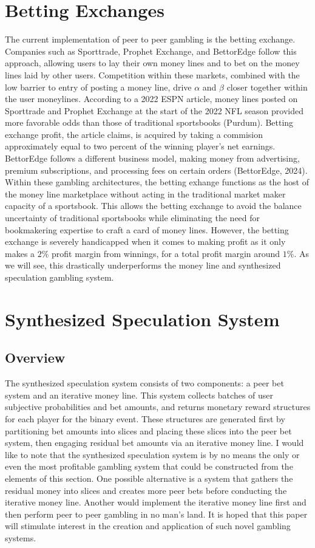 \documentclass[sn-mathphys-num]{sn-jnl}
\theoremstyle{thmstyleone}%
\theoremstyle{thmstyletwo}%
\theoremstyle{thmstylethree}%
\begin{document}
\section{Betting Exchanges}

The current implementation of peer to peer gambling is the betting exchange. Companies such as Sporttrade, Prophet Exchange, and BettorEdge follow this approach, allowing users to lay their own money lines and to bet on the money lines laid by other users. Competition within these markets, combined with the low barrier to entry of posting a money line, drive $\alpha$ and $\beta$ closer together within the user moneylines. According to a 2022 ESPN article, money lines posted on Sporttrade and Prophet Exchange at the start of the 2022 NFL season provided more favorable odds than those of traditional sportsbooks (Purdum). Betting exchange profit, the article claims, is acquired by taking a commision approximately equal to two percent of the winning player's net earnings. BettorEdge follows a different business model, making money from advertising, premium subscriptions, and processing fees on certain orders (BettorEdge, 2024). Within these gambling architectures, the betting exhange functions as the host of the money line marketplace without acting in the traditional market maker capacity of a sportsbook. This allows the betting exchange to avoid the balance uncertainty of traditional sportsbooks while eliminating the need for bookmakering expertise to craft a card of money lines. However, the betting exchange is severely handicapped when it comes to making profit as it only makes a $2\%$ profit margin from winnings, for a total profit margin around $1\%$. As we will see, this drastically underperforms the money line and synthesized speculation gambling system. 

\section{Synthesized Speculation System}

\subsection{Overview}

The synthesized speculation system consists of two components: a peer bet system and an iterative money line. This system collects batches of user subjective probabilities and bet amounts, and returns monetary reward structures for each player for the binary event. These structures are generated first by partitioning bet amounts into slices and placing these slices into the peer bet system, then engaging residual bet amounts via an iterative money line. I would like to note that the synthesized speculation system is by no means the only or even the most profitable gambling system that could be constructed from the elements of this section. One possible alternative is a system that gathers the residual money into slices and creates more peer bets before conducting the iterative money line. Another would implement the iterative money line first and then perform peer to peer gambling in no man's land. It is hoped that this paper will stimulate interest in the creation and application of such novel gambling systems.
\end{document}
